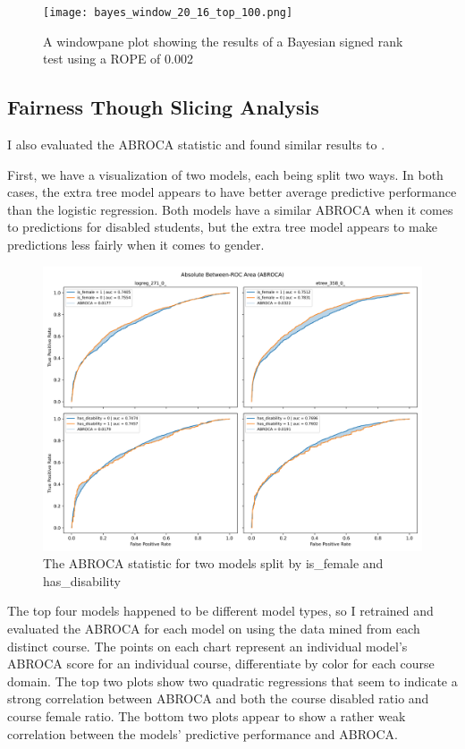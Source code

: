 \documentclass{article}
\begin{document}
        \begin{figure}
            \centering
            \texttt{[image: bayes\_window\_20\_16\_top\_100.png]}
            \caption{A windowpane plot showing the results of a Bayesian signed rank test using a ROPE of 0.002}
            \label{fig:bayes_window_20_16_top_100}
        \end{figure}

    \subsection{Fairness Though Slicing Analysis}
        I also evaluated the ABROCA statistic and found similar results to \cite{eval2019}.

        First, we have a visualization of two models, each being split two ways.
        In both cases, the extra tree model appears to have better average predictive performance than the logistic regression.
        Both models have a similar ABROCA when it comes to predictions for disabled students, but the extra tree model appears to make predictions less fairly when it comes to gender. 

        \begin{figure}
            \centering
            \includegraphics[width=1\textwidth]{abroca_logreg_271_0_etree_358_0_.png}
            \caption{The ABROCA statistic for two models split by is\_female and has\_disability}
            \label{fig:abroca_logreg_271_0_etree_358_0_}
        \end{figure}

        The top four models happened to be different model types, so I retrained and evaluated the ABROCA for each model on using the data mined from each distinct course.
        The points on each chart represent an individual model's ABROCA score for an individual course, differentiate by color for each course domain. 
        The top two plots show two quadratic regressions that seem to indicate a strong correlation between ABROCA and both the course disabled ratio and course female ratio.
        The bottom two plots appear to show a rather weak correlation between the models' predictive performance and ABROCA.
\end{document}
